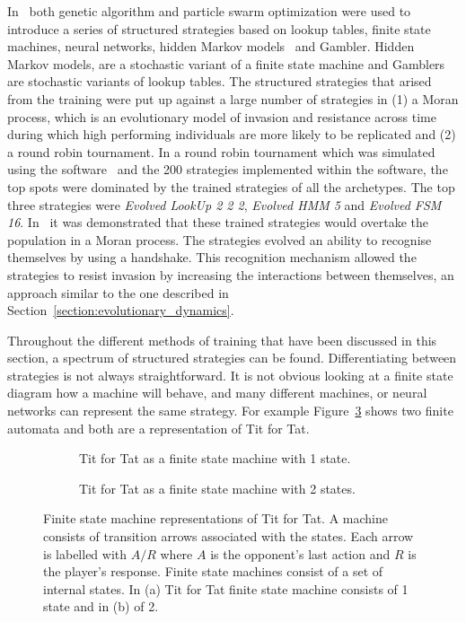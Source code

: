 In~\cite{Knight2017, KnightHGC17} both genetic algorithm and particle swarm
optimization were used to introduce a series of structured strategies based on
lookup tables, finite state machines, neural networks, hidden Markov
models~\cite{eddy1996} and Gambler. Hidden Markov models, are a stochastic
variant of a finite state machine and Gamblers are stochastic variants of lookup
tables. The structured strategies that arised from the training were put up
against a large number of strategies in (1) a Moran process, which is an
evolutionary model of invasion and resistance across time during which high
performing individuals are more likely to be replicated and (2)
a round robin tournament. In a round robin tournament which was simulated using the
software~\cite{axelrodproject} and the 200 strategies implemented within the
software, the top spots were dominated by the trained strategies of all the
archetypes. The top three strategies were \textit{Evolved
LookUp 2 2 2}, \textit{Evolved HMM 5} and \textit{Evolved FSM 16}.
In~\cite{KnightHGC17} it was demonstrated that these trained strategies
would overtake the population in a Moran process. The strategies evolved an ability
to recognise themselves by using a handshake. This recognition mechanism allowed the strategies
to resist invasion by increasing the interactions between themselves, an approach
similar to the one described in Section~\ref{section:evolutionary_dynamics}.

Throughout the different methods of training that have been discussed in this
section, a spectrum of structured strategies can be found. Differentiating
between strategies is not always straightforward. It is not obvious looking at a
finite state diagram how a machine will behave, and many different machines, or
neural networks can represent the same strategy. For example
Figure~\ref{fig:machine_tft} shows two finite automata and both are a
representation of Tit for Tat.

\begin{figure}[!hbtp]
    \begin{subfigure}{.45\textwidth}\centering
        
        \caption{Tit for Tat as a finite state machine with 1 state.}\label{fig:representation_a}
    \end{subfigure}
    \begin{subfigure}{.45\textwidth}\centering
        
        \caption{Tit for Tat as a finite state machine with 2 states.}\label{fig:representation_b}
     \end{subfigure}
     \caption{Finite state machine representations of Tit for Tat. A machine
     consists of transition arrows associated with the states. Each arrow is
     labelled with \(A/R\) where \(A\) is the opponent's last action and \(R\)
     is the player's response. Finite state machines consist of a set of
     internal states. In (a) Tit for Tat finite state
     machine consists of 1 state and in (b) of 2.}\label{fig:machine_tft}
\end{figure}

